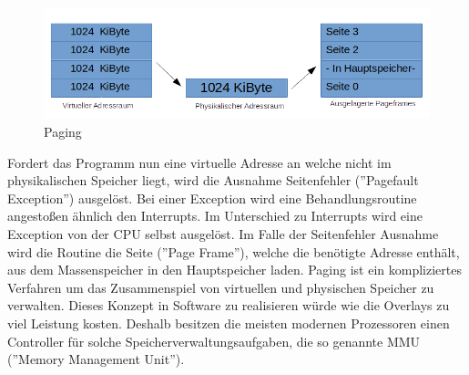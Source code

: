 \documentclass[12pt]{article}
\begin{document}
\begin{figure}[!htb]
\includegraphics[scale=0.7]{Paging}
\caption{Paging}
\centering
\label{fig:paging}
\end{figure}


Fordert das Programm nun eine virtuelle Adresse an welche nicht im physikalischen Speicher liegt, wird die Ausnahme Seitenfehler (''Pagefault Exception'') ausgelöst. Bei einer Exception wird eine Behandlungsroutine angestoßen ähnlich den Interrupts. Im Unterschied zu Interrupts wird eine Exception von der CPU selbst ausgelöst. Im Falle der Seitenfehler Ausnahme wird die Routine die Seite (''Page Frame''), welche die benötigte Adresse enthält, aus dem Massenspeicher in den Hauptspeicher laden. Paging ist ein kompliziertes Verfahren um das Zusammenspiel von virtuellen und physischen Speicher zu verwalten. Dieses Konzept in Software zu realisieren würde wie die Overlays zu viel Leistung kosten. Deshalb besitzen die meisten modernen Prozessoren einen Controller für solche Speicherverwaltungsaufgaben, die so genannte MMU (''Memory Management Unit''). \cite[S.177ff]{mikroprozessortechnik2011}
\end{document}
